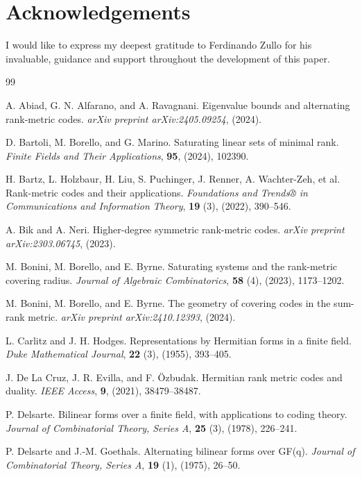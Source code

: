 \documentclass[12pt,a4paper]{article}
\begin{document}
\section*{Acknowledgements}
I would like to express my deepest gratitude to Ferdinando Zullo for his invaluable, guidance and support throughout the development of this paper.  
\begin{thebibliography}{99}

 A. Abiad, G. N. Alfarano, and A. Ravagnani. Eigenvalue bounds and alternating rank-metric codes. {\it arXiv preprint arXiv:2405.09254}, (2024).

 D. Bartoli, M. Borello, and G. Marino. Saturating linear sets of minimal rank. {\it Finite Fields and Their Applications}, \textbf{95}, (2024), 102390.

 H. Bartz, L. Holzbaur, H. Liu, S. Puchinger, J. Renner, A. Wachter-Zeh, et al. Rank-metric codes and their applications. {\it Foundations and Trends® in Communications and Information Theory}, \textbf{19} (3), (2022), 390–546.

 A. Bik and A. Neri. Higher-degree symmetric rank-metric codes. {\it arXiv preprint arXiv:2303.06745}, (2023).

 M. Bonini, M. Borello, and E. Byrne. Saturating systems and the rank-metric covering radius. {\it Journal of Algebraic Combinatorics}, \textbf{58} (4), (2023), 1173–1202.

 M. Bonini, M. Borello, and E. Byrne. The geometry of covering codes in the sum-rank metric. {\it arXiv preprint arXiv:2410.12393}, (2024).

 L. Carlitz and J. H. Hodges. Representations by Hermitian forms in a finite field. {\it Duke Mathematical Journal}, \textbf{22} (3), (1955), 393–405.

 J. De La Cruz, J. R. Evilla, and F. Özbudak. Hermitian rank metric codes and duality. {\it IEEE Access}, \textbf{9}, (2021), 38479–38487.

 P. Delsarte. Bilinear forms over a finite field, with applications to coding theory. {\it Journal of Combinatorial Theory, Series A}, \textbf{25} (3), (1978), 226–241.

 P. Delsarte and J.-M. Goethals. Alternating bilinear forms over GF(q). {\it Journal of Combinatorial Theory, Series A}, \textbf{19} (1), (1975), 26–50.


\end{thebibliography}
\end{document}
